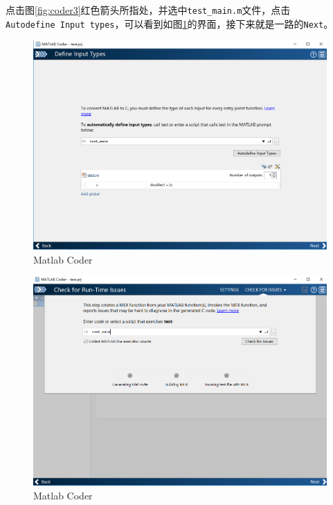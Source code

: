 \documentclass[]{ctexbook}
\theoremstyle{definition}
\theoremstyle{definition}
\theoremstyle{definition}
\theoremstyle{remark}
\begin{document}
点击图\ref{fig:coder3}红色箭头所指处，并选中\texttt{test\_main.m}文件，点击\texttt{Autodefine\ Input\ types}，可以看到如图\ref{fig:coder4}的界面，接下来就是一路的\texttt{Next}。

\begin{figure}

{\centering \includegraphics[width=0.95\linewidth]{img/coder4} 

}

\caption{Matlab Coder}\label{fig:coder4}
\end{figure}

\begin{figure}

{\centering \includegraphics[width=0.95\linewidth]{img/coder5} 

}

\caption{Matlab Coder}\label{fig:coder5}
\end{figure}
\end{document}
